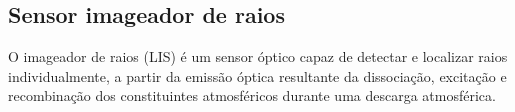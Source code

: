 
\subsection{Sensor imageador de raios}

O imageador de raios (LIS) é um sensor óptico capaz de detectar e localizar raios individualmente, a partir da emissão óptica resultante da dissociação, excitação e recombinação dos constituintes atmosféricos durante uma descarga atmosférica. 

